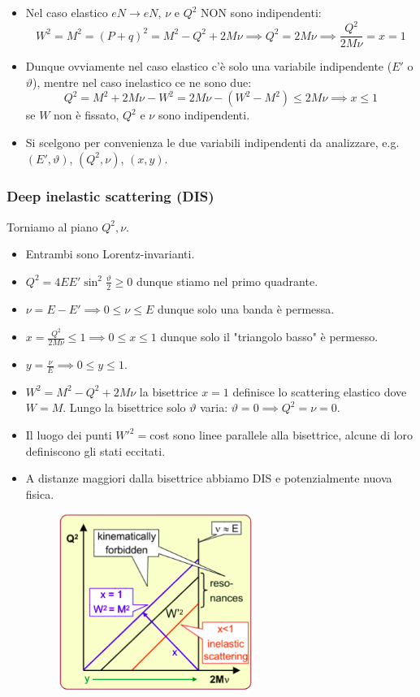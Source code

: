 \begin{itemize}
    \item Nel caso elastico $eN\to eN$, $\nu$ e $Q^2$ NON sono indipendenti:
    \begin{equation*}
    W^2=M^2=(P+q)^2=M^2-Q^2+2M\nu\implies Q^2=2M\nu\implies\frac{Q^2}{2M\nu}=x=1
    \end{equation*}
    \item Dunque ovviamente nel caso elastico c'è solo una variabile indipendente ($E'$ o $\vartheta$), mentre nel caso inelastico ce ne sono due:
    \begin{equation*}
        Q^2=M^2+2M\nu-W^2=2M\nu-(W^2-M^2)\leq2M\nu\implies x\leq1
    \end{equation*}
    se $W$ non è fissato, $Q^2$ e $\nu$ sono indipendenti.
    \item Si scelgono per convenienza le due variabili indipendenti da analizzare, e.g. $(E',\vartheta)$, $(Q^2,\nu)$, $(x,y)$.
\end{itemize}
\subsubsection{Deep inelastic scattering (DIS)}
Torniamo al piano $Q^2,\nu$.
\begin{itemize}
    \item Entrambi sono Lorentz-invarianti.
    \item $Q^2=4EE'\sin^2\frac\vartheta2\geq0$ dunque stiamo nel primo quadrante.
    \item $\nu=E-E'\implies0\leq\nu\leq E$ dunque solo una banda è permessa.
    \item $x=\frac{Q^2}{2M\nu}\leq1\implies 0\leq x\leq1$ dunque solo il "triangolo basso" è permesso.
    \item $y=\frac\nu E\implies0\leq y\leq1$.
    \item $W^2=M^2-Q^2+2M\nu$ la bisettrice $x=1$ definisce lo scattering elastico dove $W=M$. Lungo la bisettrice solo $\vartheta$ varia: $\vartheta=0\implies Q^2=\nu=0$.
    \item Il luogo dei punti $W'^2=$cost sono linee parallele alla bisettrice, alcune di loro definiscono gli stati eccitati.
    \item A distanze maggiori dalla bisettrice abbiamo DIS e potenzialmente nuova fisica.
    \begin{figure}[H]
        \centering
        \includegraphics[width=0.6\textwidth]{immagini/fig_dis.png}
    \end{figure}
\end{itemize}
